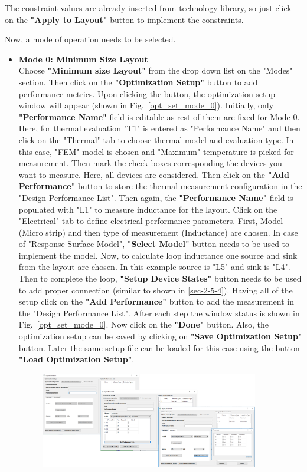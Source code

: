 \documentclass[11pt]{article}
\begin{document}
The constraint values are already inserted from technology library, so just click on the \textbf{"Apply to Layout"} button to implement the constraints.

Now, a mode of operation needs to be selected.

\begin{itemize}
    \item \textbf{Mode 0: Minimum Size Layout}\\
    Choose \textbf{"Minimum size Layout"} from the drop down list on the "Modes" section. Then click on the \textbf{"Optimization Setup"} button to add performance metrics. Upon clicking the button, the optimization setup window will appear (shown in Fig.~\ref{opt_set_mode_0}). Initially, only \textbf{"Performance Name"} field is editable as rest of them are fixed for Mode 0. Here, for thermal evaluation "T1" is entered as "Performance Name" and then click on the "Thermal" tab to choose thermal model and evaluation type. In this case, "FEM" model is chosen and "Maximum" temperature is picked for measurement. Then mark the check boxes corresponding the devices you want to measure. Here, all devices are considered. Then click on the \textbf{"Add Performance"} button to store the thermal measurement configuration in the "Design Performance List". Then again, the \textbf{"Performance Name"} field is populated with "L1" to measure inductance for the layout. Click on the "Electrical" tab to define electrical performance parameters. First, Model (Micro strip) and then type of measurement (Inductance) are chosen. In case of "Response Surface Model", \textbf{"Select Model"} button needs to be used to implement the model. Now, to calculate loop inductance one source and sink from the layout are chosen. In this example source is "L5" and sink is "L4". Then to complete the loop, \textbf{"Setup Device States"} button needs to be used to add proper connection (similar to shown in \ref{sec-2-5-4}). Having all of the setup click on the \textbf{"Add Performance"} button to add the measurement in the "Design Performance List". After each step the window status is shown in Fig.~\ref{opt_set_mode_0}. Now click on the \textbf{"Done"} button. Also, the optimization setup can be saved by clicking on \textbf{"Save Optimization Setup"} button. Later the same setup file can be loaded for this case using the button \textbf{"Load Optimization Setup"}.
    \begin{figure}[t]
    \centering
    \includegraphics[width=0.9\textwidth]{./figs/Test/Picture1.png}

\end{figure}
\end{itemize}
\end{document}
